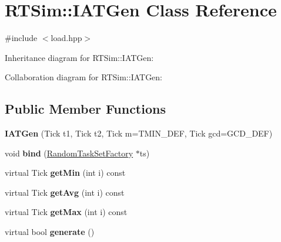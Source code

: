 \hypertarget{classRTSim_1_1IATGen}{}\section{R\+T\+Sim\+:\+:I\+A\+T\+Gen Class Reference}
\label{classRTSim_1_1IATGen}


{\ttfamily \#include $<$load.\+hpp$>$}



Inheritance diagram for R\+T\+Sim\+:\+:I\+A\+T\+Gen\+:


Collaboration diagram for R\+T\+Sim\+:\+:I\+A\+T\+Gen\+:
\subsection*{Public Member Functions}
\begin{DoxyCompactItemize}
\item 
{\bfseries I\+A\+T\+Gen} (Tick t1, Tick t2, Tick m=T\+M\+I\+N\+\_\+\+D\+EF, Tick gcd=G\+C\+D\+\_\+\+D\+EF)\hypertarget{classRTSim_1_1IATGen_a34f817d1cfb7aed57ae5252ef1621497}{}\label{classRTSim_1_1IATGen_a34f817d1cfb7aed57ae5252ef1621497}

\item 
void {\bfseries bind} (\hyperlink{classRTSim_1_1RandomTaskSetFactory}{Random\+Task\+Set\+Factory} $\ast$ts)\hypertarget{classRTSim_1_1IATGen_a75783c0b04c38af7078f5266d0c05b1e}{}\label{classRTSim_1_1IATGen_a75783c0b04c38af7078f5266d0c05b1e}

\item 
virtual Tick {\bfseries get\+Min} (int i) const \hypertarget{classRTSim_1_1IATGen_a18a7426b32641f56f613943b33b3449b}{}\label{classRTSim_1_1IATGen_a18a7426b32641f56f613943b33b3449b}

\item 
virtual Tick {\bfseries get\+Avg} (int i) const \hypertarget{classRTSim_1_1IATGen_af9937ebeef4fea1953cce0ff7d586b2a}{}\label{classRTSim_1_1IATGen_af9937ebeef4fea1953cce0ff7d586b2a}

\item 
virtual Tick {\bfseries get\+Max} (int i) const \hypertarget{classRTSim_1_1IATGen_a0703a199d0cfe5ee35693133bd4eefa0}{}\label{classRTSim_1_1IATGen_a0703a199d0cfe5ee35693133bd4eefa0}

\item 
virtual bool {\bfseries generate} ()\hypertarget{classRTSim_1_1IATGen_a5171aab5d91a8581c2046aefad2d0bdf}{}\label{classRTSim_1_1IATGen_a5171aab5d91a8581c2046aefad2d0bdf}

\end{DoxyCompactItemize}
